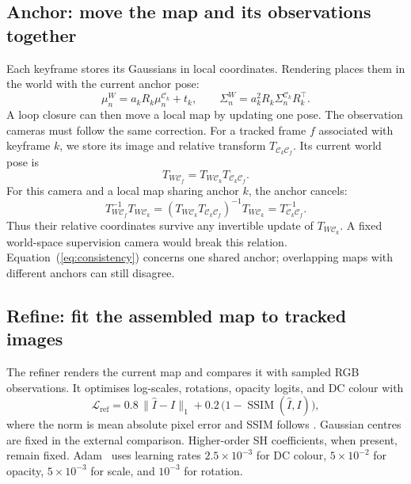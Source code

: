 \subsection{Anchor: move the map and its observations together}
\label{sec:anchor}
Each keyframe stores its Gaussians in local coordinates. Rendering places
them in the world with the current anchor pose:
\begin{equation}
  \mu_n^W=a_kR_k\mu_n^{\mathcal C_k}+t_k,\qquad
  \Sigma_n^W=a_k^2R_k\Sigma_n^{\mathcal C_k}R_k^\top .
  \label{eq:anchor}
\end{equation}
A loop closure can then move a local map by updating one pose.
The observation cameras must follow the same correction. For a tracked
frame $f$ associated with keyframe $k$, we store its image and relative
transform $T_{\mathcal C_k\mathcal C_f}$. Its current world pose is
\begin{equation}
  T_{W\mathcal C_f}
  =T_{W\mathcal C_k}T_{\mathcal C_k\mathcal C_f}.
  \label{eq:supervision}
\end{equation}
For this camera and a local map sharing anchor $k$, the anchor cancels:
\begin{equation}
  T_{W\mathcal C_f}^{-1}T_{W\mathcal C_k}
  =(T_{W\mathcal C_k}T_{\mathcal C_k\mathcal C_f})^{-1}
    T_{W\mathcal C_k}
  =T_{\mathcal C_k\mathcal C_f}^{-1}.
  \label{eq:consistency}
\end{equation}
Thus their relative coordinates survive any invertible update of
$T_{W\mathcal C_k}$.
A fixed world-space supervision camera would break this relation.
Equation~(\ref{eq:consistency}) concerns one shared anchor; overlapping maps
with different anchors can still disagree.

\subsection{Refine: fit the assembled map to tracked images}
\label{sec:refine}
The refiner renders the current map and compares it with sampled RGB
observations. It optimises log-scales, rotations, opacity logits, and DC
colour with
\begin{equation}
  \mathcal L_{\mathrm{ref}}
  =0.8\,\|\hat I-I\|_1+
    0.2\,\bigl(1-\operatorname{SSIM}(\hat I,I)\bigr),
  \label{eq:ref}
\end{equation}
where the norm is mean absolute pixel error and SSIM follows
\cite{wang2004ssim}. Gaussian centres are fixed in the external comparison.
Higher-order SH coefficients, when present, remain fixed.
Adam~\cite{kingma2015adam} uses learning rates $2.5{\times}10^{-3}$ for DC
colour, $5{\times}10^{-2}$ for opacity, $5{\times}10^{-3}$ for scale, and
$10^{-3}$ for rotation.

